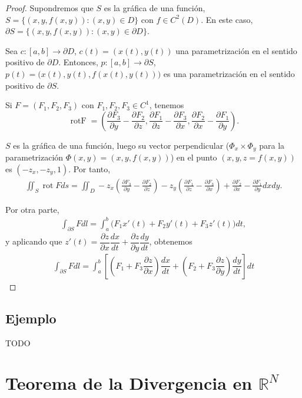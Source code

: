 \documentclass[12pt,spanish]{article}
\theoremstyle{definition}
\theoremstyle{remark}
\begin{document}
\begin{proof}
	Supondremos que $S$ es la gráfica de una función, $S=\{(x,y,f(x,y)): (x,y)\in D\}$ con $f\in C^2(D)$. En este caso, $\partial S=\{(x,y,f(x,y)): (x,y)\in \partial D\}$.
	
	Sea $c:[a,b]\rightarrow \partial D$, $c(t)=(x(t),y(t))$ una parametrización en el sentido positivo de $\partial D$. Entonces, $p:[a,b]\rightarrow \partial S$, $p(t)=\big(x(t),y(t),f(x(t),y(t))\big)$ es una parametrización en el sentido positivo de $\partial S$.
	
	Si $F=(F_1,F_2,F_3)$ con $F_1,F_2,F_3\in C^1$, tenemos
	\[\operatorname{rot F}=\left(\frac{\partial F_3}{\partial y}-\frac{\partial F_2}{\partial z},\frac{\partial F_1}{\partial z}-\frac{\partial F_3}{\partial x},\frac{\partial F_2}{\partial x}-\frac{\partial F_1}{\partial y}\right).\]
	
	$S$ es la gráfica de una función, luego su vector perpendicular \big($\Phi_x\times \Phi_y$ para la parametrización $\Phi(x,y)=(x,y,f(x,y))$\big) en el punto $(x,y,z=f(x,y))$ es $(-z_x,-z_y,1)$. Por tanto,
	\begin{align*}
	\iint_S \operatorname{rot}F ds=\iint_D -z_x\left(\frac{\partial F_3}{\partial y}-\frac{\partial F_2}{\partial z}\right) -z_y\left(\frac{\partial F_1}{\partial z}-\frac{\partial F_3}{\partial x}\right)+\frac{\partial F_2}{\partial x}-\frac{\partial F_1}{\partial y} dx dy.
	\end{align*}
	
	Por otra parte,
	\begin{align*}
	\int_{\partial S} F dl=\int_a^b \big(F_1 x'(t) + F_2 y'(t) + F_3 z'(t)\big) dt,
	\end{align*}
	y aplicando que $z'(t)=\dfrac{\partial z}{\partial x}\dfrac{d x}{d t}+\dfrac{\partial z}{\partial y}\dfrac{d y}{d t}$, obtenemos
	\begin{align*}
	\int_{\partial S} F dl=\int_a^b\left[\left(F_1+F_3\dfrac{\partial z}{\partial x}\right)\dfrac{d x}{d t}+\left(F_2+F_3\dfrac{\partial z}{\partial y}\right)\dfrac{d y}{d t}\right]dt
	\end{align*}
	
\end{proof}

\subsection*{Ejemplo}

TODO

\section{Teorema de la Divergencia en $\mathbb{R}^N$}
\end{document}
